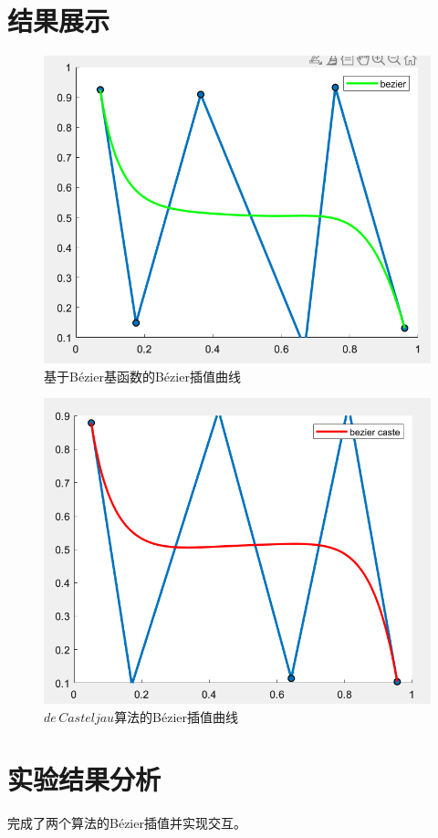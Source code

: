 \documentclass{article}
\begin{document}
	\section{结果展示}
\begin{figure}[H]
	\centering
	\includegraphics{bezier}
	\caption{基于Bézier基函数的Bézier插值曲线}
	\label{fig:bezier}
\end{figure}
\begin{figure}[H]
	\centering
	\includegraphics{bezier_caste}
	\caption{$de\,Casteljau$算法的Bézier插值曲线}
	\label{fig:bezier_caste}
\end{figure}


	\section{实验结果分析}
	完成了两个算法的Bézier插值并实现交互。
\end{document}
